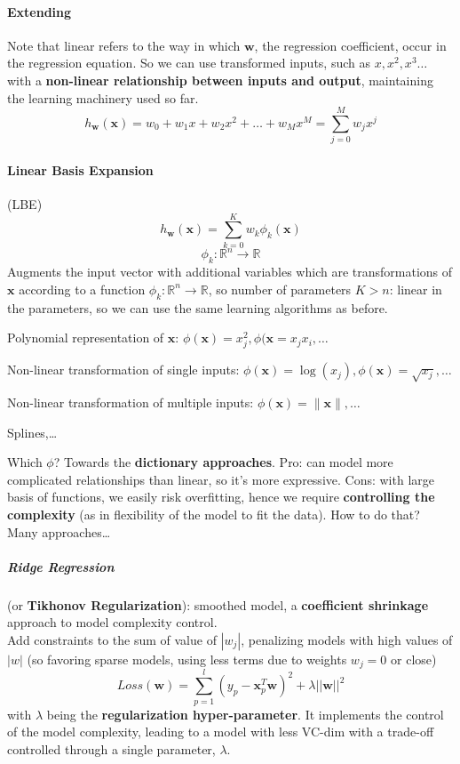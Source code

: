 \documentclass[10pt]{report}
\begin{document}
\paragraph{Extending} Note that linear refers to the way in which $\mathbf{w}$, the regression coefficient, occur in the regression equation. So we can use transformed inputs, such as $x, x^2, x^3\ldots$ with a \textbf{non-linear relationship between inputs and output}, maintaining the learning machinery used so far. $$h_\mathbf{w}(\mathbf{x}) = w_0 + w_1 x + w_2 x^2 + \ldots + w_M x^M = \sum_{j=0}^M w_j x^j$$
\paragraph{Linear Basis Expansion} (LBE) $$h_\mathbf{w}(\mathbf{x}) = \sum_{k=0}^K w_k\phi_k(\mathbf{x})$$
$$\phi_k : \mathbb{R}^n \rightarrow \mathbb{R}$$
Augments the input vector with additional variables which are transformations of $\mathbf{x}$ according to a function $\phi_k : \mathbb{R}^n \rightarrow \mathbb{R}$, so number of parameters $K > n$: linear in the parameters, so we can use the same learning algorithms as before.
\begin{list}{}{Examples are:}
	\item Polynomial representation of $\mathbf{x}$: $\phi(\mathbf{x}) = x_j^2, \phi(\mathbf{x} = x_jx_i,\ldots$
	\item Non-linear transformation of single inputs: $\phi(\mathbf{x})=\log(x_j), \phi(\mathbf{x})=\sqrt{x_j},\ldots$
	\item Non-linear transformation of multiple inputs: $\phi(\mathbf{x})=\|\mathbf{x}\|,\ldots$
	\item Splines,\ldots
\end{list}
Which $\phi$? Towards the \textbf{dictionary approaches}. Pro: can model more complicated relationships than linear, so it's more expressive. Cons: with large basis of functions, we easily risk overfitting, hence we require \textbf{controlling the complexity} (as in flexibility of the model to fit the data). How to do that? Many approaches\ldots
\subparagraph{Ridge Regression} (or \textbf{Tikhonov Regularization}): smoothed model, a \textbf{coefficient shrinkage} approach to model complexity control.\\
	Add constraints to the sum of value of $|w_j|$, penalizing models with high values of $|w|$ (so favoring sparse models, using less terms due to weights $w_j = 0$ or close)
	$$Loss(\mathbf{w}) = \sum_{p=1}^l (y_p - \mathbf{x}_p^T \mathbf{w})^2 + \lambda||\mathbf{w}||^2$$ with $\lambda$ being the \textbf{regularization hyper-parameter}. It implements the control of the model complexity, leading to a model with less VC-dim with a trade-off controlled through a single parameter, $\lambda$.
\end{document}
